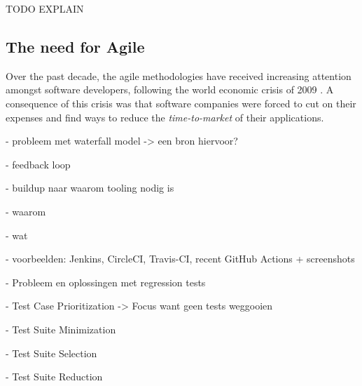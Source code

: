 TODO EXPLAIN


\subsection{The need for Agile}
Over the past decade, the agile methodologies have received increasing attention amongst software developers, following the world economic crisis of 2009 \cite{ionel2009}. A consequence of this crisis was that software companies were forced to cut on their expenses and find ways to reduce the \emph{time-to-market} of their applications.



- probleem met waterfall model -> een bron hiervoor?

- feedback loop

- buildup naar waarom tooling nodig is

- waarom

- wat

- voorbeelden: Jenkins, CircleCI, Travis-CI, recent GitHub Actions + screenshots

- Probleem en oplossingen met regression tests

  - Test Case Prioritization -> Focus want geen tests weggooien
  
  - Test Suite Minimization
  
  - Test Suite Selection
  
  - Test Suite Reduction
